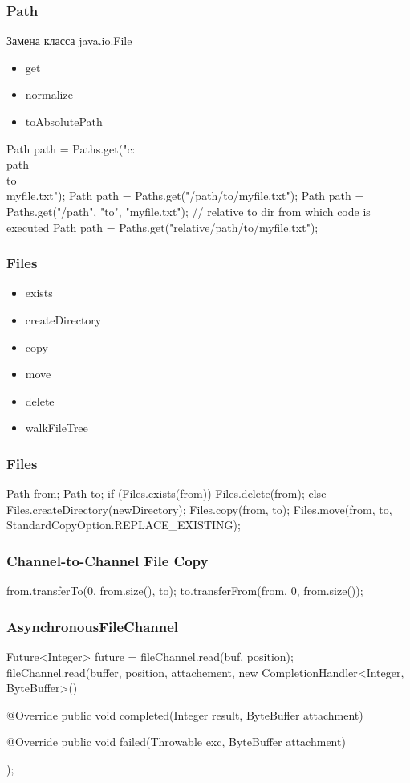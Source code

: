 \documentclass[russian,aspectratio=169,14pt]{beamer}
\begin{document}
\begin{frame}[fragile]
	\frametitle{Path}
	Замена класса java.io.File
	\begin{itemize}
		\item get
		\item normalize
		\item toAbsolutePath
	\end{itemize}
	\begin{listjava}
Path path = Paths.get("c:\\path\\to\\myfile.txt");
Path path = Paths.get("/path/to/myfile.txt");
Path path = Paths.get("/path", "to", "myfile.txt");
// relative to dir from which code is executed
Path path = Paths.get("relative/path/to/myfile.txt");
	\end{listjava}
\end{frame}

\begin{frame}
	\frametitle{Files}
	\begin{itemize}
		\item exists
		\item createDirectory
		\item copy
		\item move
		\item delete
		\item walkFileTree
	\end{itemize}
\end{frame}

\begin{frame}[fragile]
	\frametitle{Files}
	\begin{listjava}
Path from;
Path to;	
if (Files.exists(from)) {
    Files.delete(from);
} else {
    Files.createDirectory(newDirectory);
}
Files.copy(from, to);        
Files.move(from, to, StandardCopyOption.REPLACE_EXISTING);
	\end{listjava}
\end{frame}

\begin{frame}[fragile]
	\frametitle{Channel-to-Channel File Copy}
	\begin{listjava}
from.transferTo(0, from.size(), to);
to.transferFrom(from, 0, from.size());
	\end{listjava}
\end{frame}

\begin{frame}[fragile]
	\frametitle{AsynchronousFileChannel}
	\begin{listjava}
Future<Integer> future = fileChannel.read(buf, position);
fileChannel.read(buffer, position, attachement, 
        new CompletionHandler<Integer, ByteBuffer>() {
            @Override
            public void completed(Integer result, 
                 ByteBuffer attachment) {}
        
            @Override
            public void failed(Throwable exc, 
                 ByteBuffer attachment) {}
        });
	\end{listjava}
\end{frame}

\questions
\end{document}
